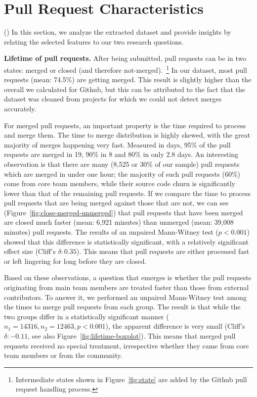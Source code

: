 \documentclass{acm_proc_article-sp}
\begin{document}
\section{Pull Request Characteristics}
(\label{sec:pullreqchar})
In this section, we analyze the extracted dataset and provide insights
by relating the selected features to our two research questions.

\textbf{Lifetime of pull requests.}
After being submitted, pull requests can be in two states: merged or closed
(and therefore not-merged).~\footnote{Intermediate states shown in
Figure~\ref{fig:state} are added by the Github pull request handling process.} 
In our dataset, most pull requests (mean: 74.5\%) are getting
merged. This result is slightly higher than the overall we calculated for
Github, but this can be attributed to the fact that the dataset was cleaned
from projects for which we could not detect merges accurately. 

For merged pull requests, an important property is the time required to process
and merge them. The time to merge distribution is highly skewed, with the great
majority of merges happening very fast. Measured in days, 95\% of the pull
requests are merged in 19, 90\% in 8 and 80\% in only 2.8 days. An interesting
observation is that there are many (8,525 or 30\% of our sample) pull requests
which are merged in under one hour; the majority of such pull requests (60\%)
come from core team members, while their source code churn is significantly
lower than that of the remaining pull requests. If we compare the time to
process pull requests that are being merged against those that are not, we can
see (Figure~\ref{fig:close-merged-unmerged}) that pull requests that have been
merged are closed much faster (mean: 6,921 minutes) than unmerged (mean: 39,008
minutes) pull requests.
The results of an unpaired Mann-Witney test ($p < 0.001$) showed that this difference is statistically significant, with a relatively
significant effect size (Cliff's $\delta: 0.35$). This means that pull requests
are either processed fast or left lingering for long before they are closed.

Based on these observations, a question that emerges is
whether the pull requests originating from main team members are treated faster
than those from external contributors. To answer it, we performed an unpaired
Mann-Witney test among the times to merge pull requests from each group. The
result is that while the two groups differ in a statistically significant manner
($n_1 = 14316, n_2 = 12463, p < 0.001$), the apparent difference is very small
(Cliff's $\delta: -0.11$, see also Figure~\ref{fig:lifetime-boxplot}). This
means that merged pull requests received no special treatment, irrespective
whether they came from core team members or from the community.
\end{document}
